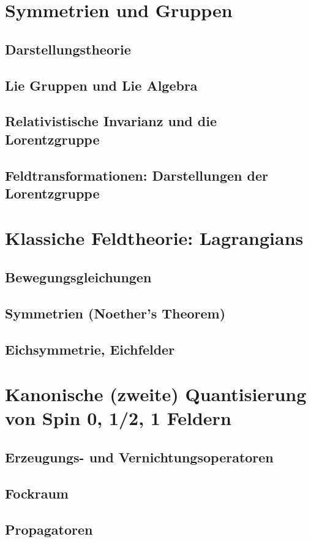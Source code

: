 \documentclass{include/thesisclass}
\begin{document}
%

\chapter{Symmetrien und Gruppen}
\section{Darstellungstheorie}
\section{Lie Gruppen und Lie Algebra}
\section{Relativistische Invarianz und die Lorentzgruppe}
\section{Feldtransformationen: Darstellungen der Lorentzgruppe}

\chapter{Klassiche Feldtheorie: Lagrangians}
\section{Bewegungsgleichungen}
\section{Symmetrien (Noether's Theorem)}
\section{Eichsymmetrie, Eichfelder}

\chapter{Kanonische (zweite) Quantisierung von Spin 0, 1/2, 1 Feldern}
\section{Erzeugungs- und Vernichtungsoperatoren}
\section{Fockraum}
\section{Propagatoren}
\end{document}
